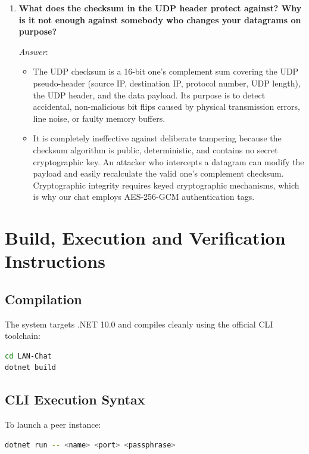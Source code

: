\documentclass[11pt,a4paper]{article}
\begin{document}
\begin{enumerate}[label=\textbf{Control Question \arabic*:}, leftmargin=*]
    \item \textbf{What does the checksum in the UDP header protect against? Why is it not enough against somebody who changes your datagrams on purpose?}
    
    \textit{Answer}:
    \begin{itemize}[noitemsep]
        \item The UDP checksum is a 16-bit one's complement sum covering the UDP pseudo-header (source IP, destination IP, protocol number, UDP length), the UDP header, and the data payload. Its purpose is to detect accidental, non-malicious bit flips caused by physical transmission errors, line noise, or faulty memory buffers.
        \item It is completely ineffective against deliberate tampering because the checksum algorithm is public, deterministic, and contains no secret cryptographic key. An attacker who intercepts a datagram can modify the payload and easily recalculate the valid one's complement checksum. Cryptographic integrity requires keyed cryptographic mechanisms, which is why our chat employs AES-256-GCM authentication tags.
    \end{itemize}
\end{enumerate}

\section{Build, Execution and Verification Instructions}

\subsection{Compilation}
The system targets .NET 10.0 and compiles cleanly using the official CLI toolchain:
\begin{lstlisting}[language=bash]
cd LAN-Chat
dotnet build
\end{lstlisting}

\subsection{CLI Execution Syntax}
To launch a peer instance:
\begin{lstlisting}[language=bash]
dotnet run -- <name> <port> <passphrase>
\end{lstlisting}
\end{document}
